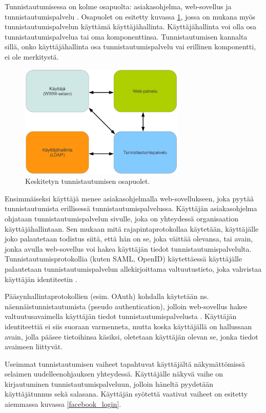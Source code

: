 Tunnistautumisessa on kolme osapuolta: asiakasohjelma, web-sovellus ja tunnistautumispalvelu \cite{nisti}. Osapuolet on esitetty kuvassa \ref{composition}, jossa on mukana myös tunnistautumispalvelun käyttämä käyttäjähallinta. Käyttäjähallinta voi olla osa tunnistautumispalvelua tai oma komponenttinsa. Tunnistautumisen kannalta sillä, onko käyttäjähallinta osa tunnistautumispalvelu vai erillinen komponentti, ei ole merkitystä.

\begin{figure}[ht]
\centering
\includegraphics[width=0.7\textwidth]{teknologiat/composition.eps}
\caption{Keskitetyn tunnistautumisen osapuolet.}%
\label{composition}
\end{figure}

Ensimmäiseksi käyttäjä menee asiakasohjelmalla web-sovellukseen, joka pyytää tunnistautumista erillisessä tunnistautumispalvelussa. Käyttäjän asiakasohjelma ohjataan tunnistautumispalvelun sivulle, joka on yhteydessä organisaation käyttäjähallintaan. Sen mukaan mitä rajapintaprotokollaa käytetään, käyttäjälle joko palautetaan todistus siitä, että hän on se, joka väittää olevansa, tai avain, jonka avulla web-sovellus voi hakea käyttäjän tiedot tunnistautumispalvelulta. Tunnistautumisprotokollia (kuten SAML, OpenID) käytettäessä käyttäjälle palautetaan tunnistautumispalvelun allekirjoittama valtuutustieto, joka vahvistaa käyttäjän identiteetin \cite{nisti}.

Pääsynhallintaprotokollien (esim. OAuth) kohdalla käytetään ns. näennäistunnistautumista (pseudo authentication), jolloin web-sovellus hakee valtuutusavaimella käyttäjän tiedot tunnistautumispalvelusta \cite{distributed_web_security}. Käyttäjän identiteettiä ei siis suoraan varmenneta, mutta koska käyttäjällä on hallussaan avain, jolla pääsee tietoihinsa käsiksi, oletetaan käyttäjän olevan se, jonka tiedot avaimeen liittyvät.

Useimmat tunnistautumisen vaiheet tapahtuvat käyttäjältä näkymättömissä selaimen uudelleenohjauksen yhteydessä. Käyttäjälle näkyvä vaihe on kirjautuminen tunnistautumispalveluun, jolloin häneltä pyydetään käyttäjätunnus sekä salasana. Käyttäjän syötettä vaativat vaiheet on esitetty aiemmassa kuvassa \ref{facebook_login}.